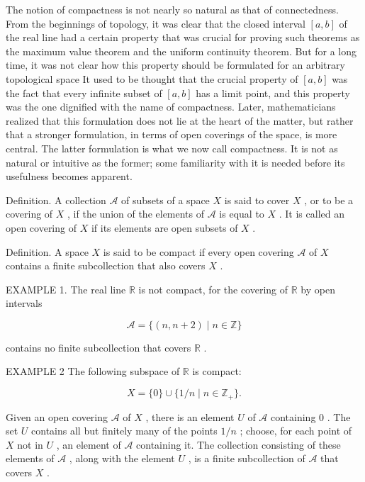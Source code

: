 The notion of compactness is not nearly so natural as that of connectedness. From the beginnings of topology, it was clear that the closed interval \(\left\lbrack  {a,b}\right\rbrack\) of the real line had a certain property that was crucial for proving such theorems as the maximum value theorem and the uniform continuity theorem. But for a long time, it was not clear how this property should be formulated for an arbitrary topological space It used to be thought that the crucial property of \(\left\lbrack  {a,b}\right\rbrack\) was the fact that every infinite subset of \(\left\lbrack  {a,b}\right\rbrack\) has a limit point, and this property was the one dignified with the name of compactness. Later, mathematicians realized that this formulation does not lie at the heart of the matter, but rather that a stronger formulation, in terms of open coverings of the space, is more central. The latter formulation is what we now call compactness. It is not as natural or intuitive as the former; some familiarity with it is needed before its usefulness becomes apparent.

Definition. A collection \(\mathcal{A}\) of subsets of a space \(X\) is said to cover \(X\) , or to be a covering of \(X\) , if the union of the elements of \(\mathcal{A}\) is equal to \(X\) . It is called an open covering of \(X\) if its elements are open subsets of \(X\) .

Definition. A space \(X\) is said to be compact if every open covering \(\mathcal{A}\) of \(X\) contains a finite subcollection that also covers \(X\) .

EXAMPLE 1. The real line \(\mathbb{R}\) is not compact, for the covering of \(\mathbb{R}\) by open intervals

\[
\mathcal{A} = \{ \left( {n,n + 2}\right)  \mid  n \in  \mathbb{Z}\}
\]

contains no finite subcollection that covers \(\mathbb{R}\) .

EXAMPLE 2 The following subspace of \(\mathbb{R}\) is compact:

\[
X = \{ 0\}  \cup  \{ 1/n \mid  n \in  {\mathbb{Z}}_{ + }\} .
\]

Given an open covering \(\mathcal{A}\) of \(X\) , there is an element \(U\) of \(\mathcal{A}\) containing 0 . The set \(U\) contains all but finitely many of the points \(1/n\) ; choose, for each point of \(X\) not in \(U\) , an element of \(\mathcal{A}\) containing it. The collection consisting of these elements of \(\mathcal{A}\) , along with the element \(U\) , is a finite subcollection of \(\mathcal{A}\) that covers \(X\) .

